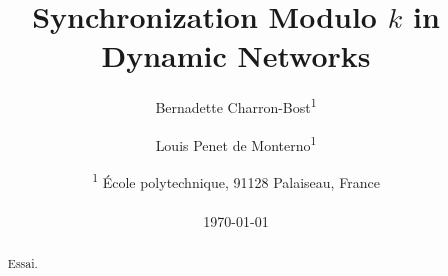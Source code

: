 \documentclass[11pt,letterpaper]{article}
\begin{document}
\title{Synchronization Modulo $k$ in Dynamic Networks}

 \author{%
 Bernadette Charron-Bost\textsuperscript{1} 
  \and Louis Penet de Monterno\textsuperscript{1}}
 \date{\textsuperscript{1} \'Ecole polytechnique, 91128 Palaiseau, France\\~\\
 \today
  }

\maketitle



\begin{abstract}

Essai.
\end{abstract}




	

%




\end{document}
